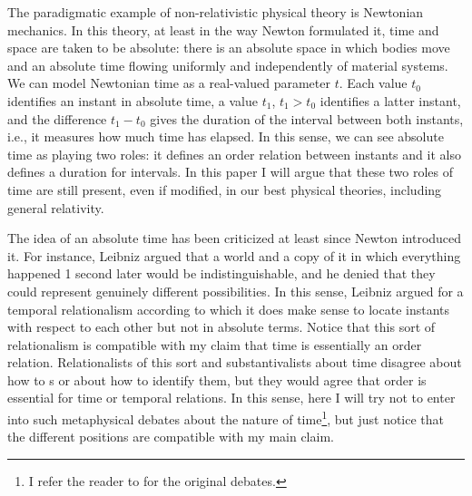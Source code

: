 \documentclass[12 pt]{article}
\begin{document}
The paradigmatic example of non-relativistic physical theory is Newtonian mechanics. In this theory, at least in the way Newton formulated it, time and space are taken to be absolute: there is an absolute space in which bodies move and an absolute time flowing uniformly and independently of material systems. We can model Newtonian time as a real-valued parameter $t$. Each value $t_0$ identifies an instant in absolute time, a value $t_1$, $t_1>t_0$ identifies a latter instant, and the difference $t_1-t_0$ gives the duration of the interval between both instants, i.e., it measures how much time has elapsed. In this sense, we can see absolute time as playing two roles: it defines an order relation between instants and it also defines a duration for intervals. In this paper I will argue that these two roles of time are still present, even if modified, in our best physical theories, including general relativity.

The idea of an absolute time has been criticized at least since Newton introduced it. For instance, Leibniz argued that a world and a copy of it in which everything happened 1 second later would be indistinguishable, and he denied that they could represent genuinely different possibilities. In this sense, Leibniz argued for a temporal relationalism according to which it does make sense to locate instants with respect to each other but not in absolute terms. Notice that this sort of relationalism is compatible with my claim that time is essentially an order relation. Relationalists of this sort and substantivalists about time disagree about how to s or about how to identify them, but they would agree that order is essential for time or temporal relations. In this sense, here I will try not to enter into such metaphysical debates about the nature of time\footnote{I refer the reader to \citep{Leibniz1715} for the original debates.}, but just notice that the different positions are compatible with my main claim.
\end{document}
